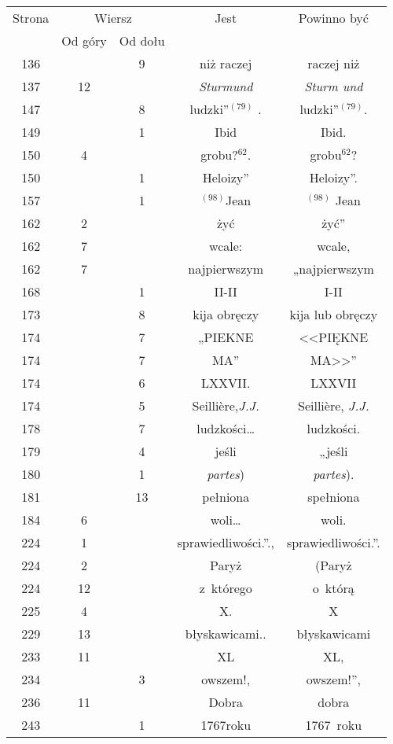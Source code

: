 \documentclass[a4paper,11pt]{article}
\numberwithin{equation}{section}
\begin{document}
\begin{center}
  \newpage

  \begin{tabular}{|c|c|c|c|c|}
    \hline
    Strona & \multicolumn{2}{c|}{Wiersz} & Jest
                              & Powinno być \\ \cline{2-3}
    & Od góry & Od dołu & & \\
    \hline
    136 & &  9 & niż raczej & raczej niż \\
    137 & 12 & & \textit{Sturmund} & \textit{Sturm und} \\
    147 & &  8 & ludzki”$^{ ( 79 ) }$ . & ludzki”$^{ ( 79 ) }$. \\
    149 & &  1 & Ibid & Ibid. \\
    150 &  4 & & grobu?$^{ 62 }$. & grobu$^{ 62 }$? \\
    150 & &  1 & Heloizy” & Heloizy”. \\
    157 & &  1 & $^{ ( 98 ) }$Jean & $^{ ( 98 ) }$ Jean \\
    162 &  2 & & żyć & żyć” \\
    162 &  7 & & wcale: & wcale, \\
    162 &  7 & & najpierwszym & „najpierwszym \\
    168 & &  1 & II-II & I-II \\
    173 & &  8 & kija obręczy & kija lub obręczy \\
    174 & &  7 & „PIEKNE & <<PIĘKNE  %
    \\
    174 & &  7 & {\footnotesize MA}” & {\footnotesize MA}>>” \\
    174 & &  6 & LXXVII. & LXXVII \\
    174 & &  5 & Seilli\`{e}re,\textit{J.J.}
           & Seilli\`{e}re, \textit{J.J.} \\
    178 & &  7 & ludzkości\ldots & ludzkości. \\
    179 & &  4 & jeśli & „jeśli \\
    180 & &  1 & \textit{partes}) & \textit{partes}). \\
    181 & & 13 & pełniona & spełniona \\
    184 &  6 & & woli\ldots & woli. \\
    224 &  1 & & sprawiedliwości.”., & sprawiedliwości.”. \\
    224 &  2 & & Paryż & (Paryż \\
    224 & 12 & & z~którego & o~którą \\
    225 &  4 & & X. & X \\
    229 & 13 & & błyskawicami.. & błyskawicami \\
    233 & 11 & & XL & XL, \\
    234 & &  3 & owszem!, & owszem!”, \\
    236 & 11 & & Dobra & dobra \\
    243 & &  1 & 1767roku & 1767~roku \\
    \hline
  \end{tabular}

\end{center}
\end{document}
